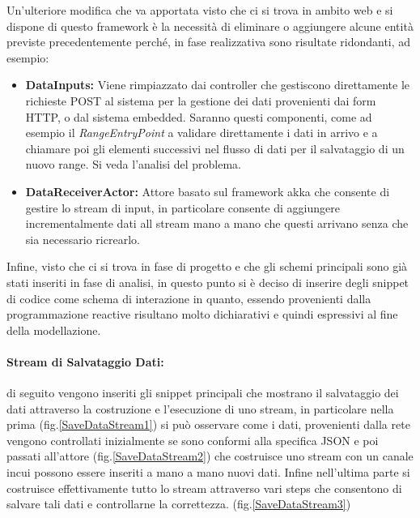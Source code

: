 Un'ulteriore modifica che va apportata visto che ci si trova in ambito web e si dispone di questo framework \`e la necessit\`a di eliminare o aggiungere alcune entit\`a previste precedentemente perch\'e, in fase realizzativa sono risultate ridondanti, ad esempio:
\begin{itemize}
\item \textbf{DataInputs:} Viene rimpiazzato dai controller che gestiscono direttamente le richieste POST al sistema per la gestione dei dati provenienti dai form HTTP, o dal sistema embedded. Saranno questi componenti, come ad esempio il \textit{RangeEntryPoint} a validare direttamente i dati in arrivo e a chiamare poi gli elementi successivi nel flusso di dati per il salvataggio di un nuovo range. Si veda l'analisi del problema.
  \item \textbf{DataReceiverActor: } Attore basato sul framework akka che consente di gestire lo stream di input, in particolare consente di aggiungere incrementalmente dati all stream mano a mano che questi arrivano senza che sia necessario ricrearlo.
\end{itemize}

Infine, visto che ci si trova in fase di progetto e che gli schemi principali sono gi\`a stati inseriti in fase di analisi, in questo punto si \`e deciso di inserire degli snippet di codice come schema di interazione in quanto, essendo provenienti dalla programmazione reactive risultano molto dichiarativi e quindi espressivi al fine della modellazione.

\paragraph{Stream di Salvataggio Dati:} di seguito vengono inseriti gli snippet principali che mostrano il salvataggio dei dati attraverso la costruzione e l'esecuzione di uno stream, in particolare nella prima (fig.\ref{SaveDataStream1}) si pu\`o osservare come i dati, provenienti dalla rete vengono controllati inizialmente se sono conformi alla specifica JSON e poi passati all'attore (fig.\ref{SaveDataStream2}) che costruisce uno stream con un canale incui possono essere inseriti a mano a mano nuovi dati. Infine nell'ultima parte si costruisce effettivamente tutto lo stream attraverso vari steps che consentono di salvare tali dati e controllarne la correttezza. (fig.\ref{SaveDataStream3})

